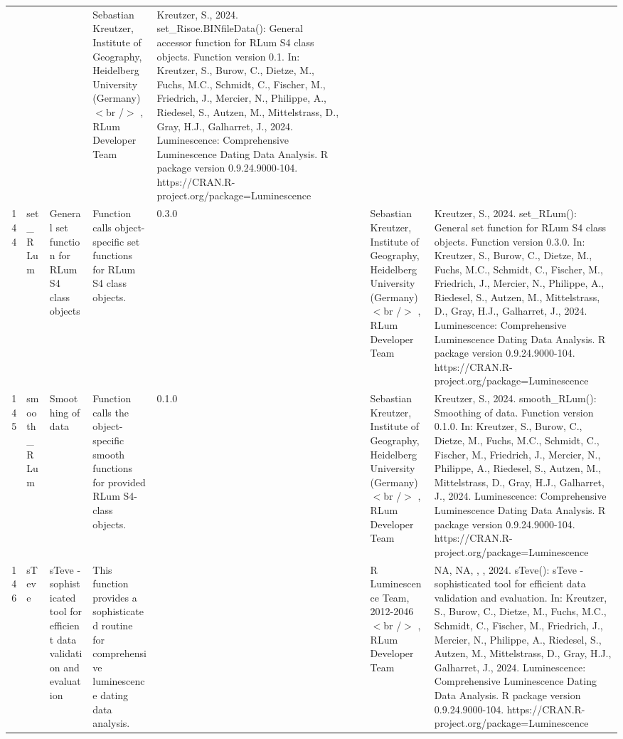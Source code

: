 \begin{table}[ht]
\begin{tabular}{rllllllll}
 &  &  & Sebastian Kreutzer, Institute of Geography, Heidelberg University (Germany)$<$br /$>$ , RLum Developer Team & Kreutzer, S., 2024. set\_Risoe.BINfileData(): General accessor function for RLum S4 class objects. Function version 0.1. In: Kreutzer, S., Burow, C., Dietze, M., Fuchs, M.C., Schmidt, C., Fischer, M., Friedrich, J., Mercier, N., Philippe, A., Riedesel, S., Autzen, M., Mittelstrass, D., Gray, H.J., Galharret, J., 2024. Luminescence: Comprehensive Luminescence Dating Data Analysis. R package version 0.9.24.9000-104. https://CRAN.R-project.org/package=Luminescence
 \\ 
  144 & set\_RLum & General set function for RLum S4 class objects & Function calls object-specific set functions for RLum S4 class objects. & 0.3.0
 &  &  & Sebastian Kreutzer, Institute of Geography, Heidelberg University (Germany)$<$br /$>$ , RLum Developer Team & Kreutzer, S., 2024. set\_RLum(): General set function for RLum S4 class objects. Function version 0.3.0. In: Kreutzer, S., Burow, C., Dietze, M., Fuchs, M.C., Schmidt, C., Fischer, M., Friedrich, J., Mercier, N., Philippe, A., Riedesel, S., Autzen, M., Mittelstrass, D., Gray, H.J., Galharret, J., 2024. Luminescence: Comprehensive Luminescence Dating Data Analysis. R package version 0.9.24.9000-104. https://CRAN.R-project.org/package=Luminescence
 \\ 
  145 & smooth\_RLum & Smoothing of data & Function calls the object-specific smooth functions for provided RLum S4-class objects. & 0.1.0
 &  &  & Sebastian Kreutzer, Institute of Geography, Heidelberg University (Germany)$<$br /$>$ , RLum Developer Team & Kreutzer, S., 2024. smooth\_RLum(): Smoothing of data. Function version 0.1.0. In: Kreutzer, S., Burow, C., Dietze, M., Fuchs, M.C., Schmidt, C., Fischer, M., Friedrich, J., Mercier, N., Philippe, A., Riedesel, S., Autzen, M., Mittelstrass, D., Gray, H.J., Galharret, J., 2024. Luminescence: Comprehensive Luminescence Dating Data Analysis. R package version 0.9.24.9000-104. https://CRAN.R-project.org/package=Luminescence
 \\ 
  146 & sTeve & sTeve - sophisticated tool for efficient data validation and evaluation & This function provides a sophisticated routine for comprehensive luminescence dating data analysis. &  &  &  & R Luminescence Team, 2012-2046$<$br /$>$ , RLum Developer Team & NA, NA, , , 2024. sTeve(): sTeve - sophisticated tool for efficient data validation and evaluation. In: Kreutzer, S., Burow, C., Dietze, M., Fuchs, M.C., Schmidt, C., Fischer, M., Friedrich, J., Mercier, N., Philippe, A., Riedesel, S., Autzen, M., Mittelstrass, D., Gray, H.J., Galharret, J., 2024. Luminescence: Comprehensive Luminescence Dating Data Analysis. R package version 0.9.24.9000-104. https://CRAN.R-project.org/package=Luminescence

\end{tabular}
\end{table}
